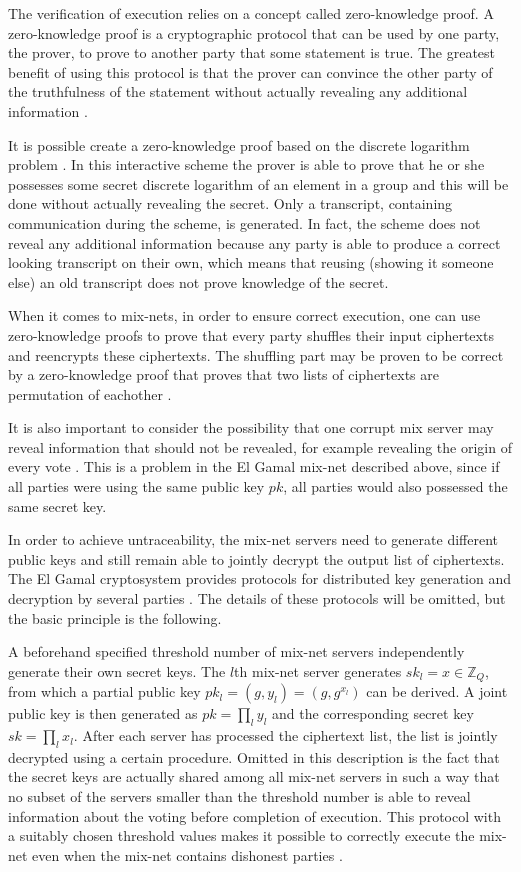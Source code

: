 The verification of execution relies on a concept called
zero-knowledge proof. A zero-knowledge proof is a cryptographic
protocol that can be used by one party, the prover, to prove to
another party that some statement is true. The greatest benefit of
using this protocol is that the prover can convince the other party of
the truthfulness of the statement without actually revealing any
additional information \cite{shoup}.

It is possible create a zero-knowledge proof based on the discrete
logarithm problem \cite{shoup}. In this interactive scheme the prover
is able to prove that he or she possesses some secret discrete
logarithm of an element in a group and this will be done without
actually revealing the secret. Only a transcript, containing
communication during the scheme, is generated. In fact, the scheme
does not reveal any additional information because any party is able
to produce a correct looking transcript on their own, which means that
reusing (showing it someone else) an old transcript does not prove
knowledge of the secret.

When it comes to mix-nets, in order to ensure correct execution, one
can use zero-knowledge proofs to prove that every party shuffles their
input ciphertexts and reencrypts these ciphertexts. The shuffling part
may be proven to be correct by a zero-knowledge proof that proves that
two lists of ciphertexts are permutation of eachother \cite{terelius}. 

It is also important to consider the possibility that one corrupt mix
server may reveal information that should not be revealed, for example
revealing the origin of every vote \cite{electronicvoting}. This is a
problem in the El Gamal mix-net described above, since if all parties
were using the same public key $pk$, all parties would also possessed
the same secret key.

In order to achieve untraceability, the mix-net servers need to
generate different public keys and still remain able to jointly
decrypt the output list of ciphertexts. The El Gamal cryptosystem
provides protocols for distributed key generation and decryption by
several parties \cite{wikstrom1}. The details of these protocols
will be omitted, but the basic principle is the following.

A beforehand specified threshold number of mix-net servers
independently generate their own secret keys. The $l$th mix-net server
generates $sk_l = x \in \mathbb{Z}_Q$, from which a partial public key
$pk_l = (g,y_l) = (g,g^{x_l})$ can be derived. A joint public key is
then generated as $pk = \prod_l y_l$ and the corresponding secret key
$sk = \prod_l x_l$. After each server has processed the ciphertext
list, the list is jointly decrypted using a certain procedure. Omitted
in this description is the fact that the secret keys are actually
shared among all mix-net servers in such a way that no subset of the
servers smaller than the threshold number is able to reveal
information about the voting before completion of execution. This
protocol with a suitably chosen threshold values makes it possible to
correctly execute the mix-net even when the mix-net contains dishonest
parties \cite{wikstrom1}.


